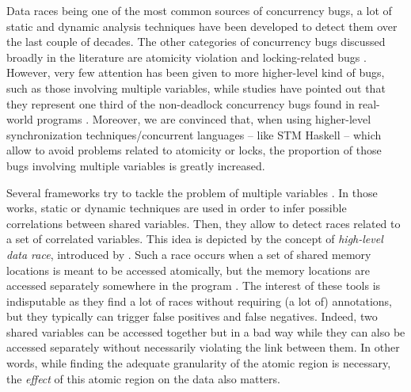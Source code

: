 \documentclass[submission,copyright,creativecommons]{eptcs}
\begin{document}
Data races being one of the most common sources of concurrency bugs, a lot of static \cite{survey-methods-preventing,effective-static-race,warlock-static-data,racerx-effective-static,kiss-keep-simple,race-checking-context,automated-type-based,locksmith-context-sensitive,type-based-race,ownership-types-safe,programming-model-concurrent} and dynamic \cite{literace-effective-sampling,eraser-dynamic-data,hybrid-dynamic-data,racetrack-efficient-detection,goldilocks-race-transaction,randomized-active-atomicity} analysis techniques have been developed to detect them \cite{optimal-tracing-replay} over the last couple of decades. 
The other categories of concurrency bugs discussed broadly in the literature are atomicity violation \cite{type-effect-system,avio-detecting-atomicity,atom-aid-detecting} and locking-related bugs \cite{eraser-dynamic-data}. 
However, very few attention has been given to more higher-level kind of bugs, such as those involving multiple variables, while studies have pointed out that they represent one third of the non-deadlock concurrency bugs found in real-world programs \cite{learning-mistakes-comprehensive}. 
Moreover, we are convinced that, when using higher-level synchronization techniques/concurrent languages -- like STM Haskell -- which allow to avoid problems related to atomicity or locks, the proportion of those bugs involving multiple variables is greatly increased.   




Several frameworks try to tackle the problem of multiple variables \cite{muvi-automatically-inferring,colorsafe-architectural-support,finding-concurrency-bugs,high-level-data,detection-transactional-memory,practical-verification-high-level}.
In those works, static or dynamic techniques are used in order to infer possible correlations between shared variables. 
Then, they allow to detect races related to a set of correlated variables.
This idea is depicted by the concept of {\em high-level data race}, introduced by \cite{high-level-data}. 
Such a race occurs when a set of shared memory locations is meant to be accessed atomically, but the memory locations are accessed separately somewhere in the program \cite{detection-transactional-memory,practical-verification-high-level}. 
The interest of these tools is indisputable as they find a lot of races without requiring (a lot of) annotations, but they typically can trigger false positives and false negatives. 
Indeed, two shared variables can be accessed together but in a bad way while they can also be accessed separately without necessarily violating the link between them.
In other words, while finding the adequate granularity of the atomic region is necessary, the \emph{effect} of this atomic region on the data also matters.  
\end{document}
